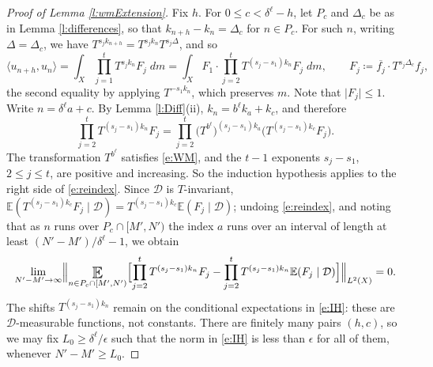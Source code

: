 \begin{proof}[Proof of Lemma \ref{l:wmExtension}]
Fix $h$.  For $0 \leq c < \delta ^{\ell}-h$, let $P_c$ and $\Delta _c$ be as in Lemma \ref{l:differences}, so that $k_{n+h}-k_n = \Delta _c$ for $n \in P_c$.
For such $n$, writing $\Delta = \Delta _c$, we have $T ^{s_jk_{n+h}} = T ^{s_jk_n}T ^{s_j\Delta}$, and so
\begin{equation} \label{e:2inner}
\langle u_{n+h}, u_n\rangle
= \int_X \prod _{j=1}^t T ^{s_jk_n} F_j \;dm
= \int_X F_1 \cdot \prod _{j=2}^t T ^{(s_j-s_1)k_n} F_j \;dm ,
\qquad F_j \coloneqq \overline{f_j} \cdot T ^{s_j\Delta _c}f_j ,
\end{equation}
the second equality by applying $T ^{-s_1k_n}$, which preserves $m$.  Note that $\lvert F_j\rvert \leq 1$.
Write $n = \delta ^{\ell}a + c$.  By Lemma \ref{l:Diff}(ii), $k_n = b ^{\ell}k_a + k_c$, and therefore
\begin{equation} \label{e:reindex}
\prod _{j=2}^t T ^{(s_j-s_1)k_n} F_j
= \prod _{j=2}^t \bigl( T ^{b ^{\ell}}\bigr) ^{(s_j-s_1)k_a} \bigl( T ^{(s_j-s_1)k_c} F_j \bigr) .
\end{equation}
The transformation $T ^{b ^{\ell}}$ satisfies \eqref{e:WM}, and the $t-1$ exponents $s_j - s_1$, $2 \leq j \leq t$, are positive and increasing.
So the induction hypothesis applies to the right side of \eqref{e:reindex}.
Since $\mathcal D$ is $T$-invariant, $\mathbb E( T ^{(s_j-s_1)k_c} F_j \mid \mathcal D) = T ^{(s_j-s_1)k_c}\mathbb E(F_j \mid \mathcal D)$; undoing \eqref{e:reindex},
and noting that as $n$ runs over $P_c \cap [M',N')$ the index $a$ runs over an interval of length at least $(N'-M')/ \delta ^{\ell} - 1$, we obtain
\begin{equation} \label{e:IH}
\lim_{N'-M'\to\infty}
\Bigl\lVert \Expectation_{n \in P_c\cap[M',N')} \Bigl[ \prod _{j=2}^t T ^{(s_j-s_1)k_n} F_j - \prod _{j=2}^t T ^{(s_j-s_1)k_n} \mathbb E(F_j\mid \mathcal D) \Bigr] \Bigr\rVert _{L^2(X)} = 0 .
\end{equation}
The shifts $T ^{(s_j-s_1)k_n}$ remain on the conditional expectations in \eqref{e:IH}: these are $\mathcal D$-measurable functions, not constants.
There are finitely many pairs $(h,c)$, so we may fix $L_0 \geq \delta ^{\ell}/ \epsilon$ such that the norm in \eqref{e:IH} is less than $\epsilon$ for all of them,
whenever $N'-M' \geq L_0$.


\end{proof}

